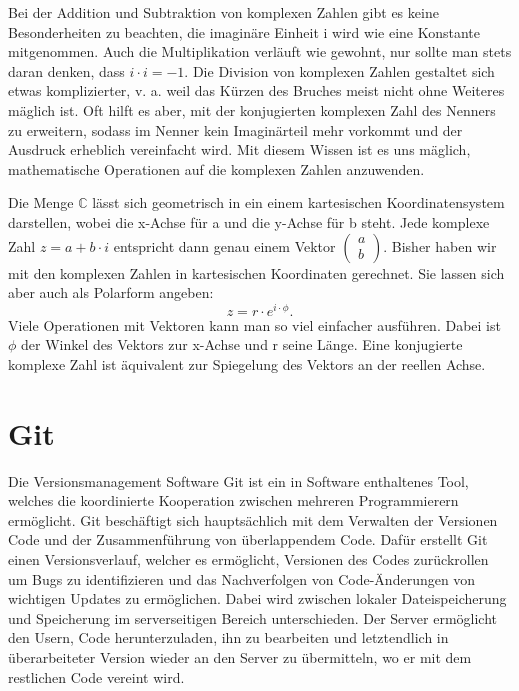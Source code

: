 \documentclass[]{dsadokumentation}
\begin{document}
Bei der Addition und Subtraktion von komplexen Zahlen gibt es keine Besonderheiten zu beachten, die imaginäre Einheit i wird wie eine Konstante mitgenommen. Auch die Multiplikation verläuft wie gewohnt, nur sollte man stets daran denken, dass $i\cdot i=-1$.
Die Division von komplexen Zahlen gestaltet sich etwas komplizierter, v. a. weil das Kürzen des Bruches meist nicht ohne Weiteres mäglich ist. Oft hilft es aber, mit der konjugierten komplexen Zahl des Nenners zu erweitern, sodass im Nenner kein Imaginärteil mehr vorkommt und der Ausdruck erheblich vereinfacht wird. Mit diesem Wissen ist es uns mäglich, mathematische Operationen auf die komplexen Zahlen anzuwenden. 

Die Menge $\mathbb{C}$ lässt sich geometrisch in ein einem kartesischen Koordinatensystem darstellen, wobei die x-Achse für a und die y-Achse für b steht. Jede komplexe Zahl $z=a+b\cdot i$ entspricht dann genau einem Vektor $\begin{pmatrix} a\\b
\end{pmatrix}$. 
Bisher haben wir mit den komplexen Zahlen in kartesischen Koordinaten gerechnet. Sie lassen sich aber auch als Polarform angeben: 
\begin{displaymath}
z=r\cdot e^{i\cdot\phi}.
\end{displaymath}
Viele Operationen mit Vektoren kann man so viel einfacher ausführen. Dabei ist $\phi$ der Winkel des Vektors zur x-Achse und r seine Länge. Eine konjugierte komplexe Zahl ist äquivalent zur Spiegelung des Vektors an der reellen Achse.

\section{Git}
Die Versionsmanagement Software Git ist ein in Software enthaltenes Tool, welches die koordinierte Kooperation zwischen mehreren Programmierern ermöglicht. Git beschäftigt sich hauptsächlich mit dem Verwalten der Versionen Code und der Zusammenführung von überlappendem Code. Dafür erstellt Git einen Versionsverlauf, welcher es ermöglicht, Versionen des Codes zurückrollen um Bugs zu identifizieren und das Nachverfolgen von Code-Änderungen von wichtigen Updates zu ermöglichen. Dabei wird zwischen lokaler Dateispeicherung und Speicherung im serverseitigen Bereich unterschieden. Der Server ermöglicht den Usern, Code herunterzuladen, ihn zu bearbeiten und letztendlich in überarbeiteter Version wieder an den Server zu übermitteln, wo er mit dem restlichen Code vereint wird.
\end{document}
